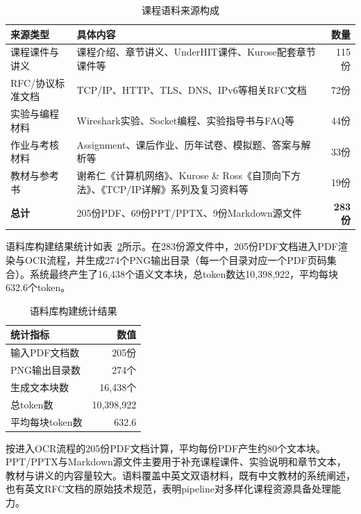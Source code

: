 \begin{table}[H]
    \centering
    \caption{课程语料来源构成}
    \label{tab:5-3}
    \begin{tabular}{lp{8cm}r}
    \toprule
    \textbf{来源类型} & \textbf{具体内容} & \textbf{数量} \\
    \midrule
    课程课件与讲义 & 课程介绍、章节讲义、UnderHIT课件、Kurose配套章节课件等 & 115份 \\
    RFC/协议标准文档 & TCP/IP、HTTP、TLS、DNS、IPv6等相关RFC文档 & 72份 \\
    实验与编程材料 & Wireshark实验、Socket编程、实验指导书与FAQ等 & 44份 \\
    作业与考核材料 & Assignment、课后作业、历年试卷、模拟题、答案与解析等 & 33份 \\
    教材与参考书 & 谢希仁《计算机网络》、Kurose \& Ross《自顶向下方法》、《TCP/IP详解》系列及复习资料等 & 19份 \\
    \midrule
    \textbf{总计} & 205份PDF、69份PPT/PPTX、9份Markdown源文件 & \textbf{283份} \\
    \bottomrule
    \end{tabular}
\end{table}

语料库构建结果统计如表~\ref{tab:5-4}所示。在283份源文件中，205份PDF文档进入PDF渲染与OCR流程，并生成274个PNG输出目录（每一个目录对应一个PDF页码集合）。系统最终产生了16,438个语义文本块，总token数达10,398,922，平均每块632.6个token。

\begin{table}[ht]
    \centering
    \caption{语料库构建统计结果}
    \label{tab:5-4}
    \begin{tabular}{lr}
    \toprule
    \textbf{统计指标} & \textbf{数值} \\
    \midrule
    输入PDF文档数 & 205份 \\
    PNG输出目录数 & 274个 \\
    生成文本块数 & 16,438个 \\
    总token数 & 10,398,922 \\
    平均每块token数 & 632.6 \\
    \bottomrule
    \end{tabular}
\end{table}

按进入OCR流程的205份PDF文档计算，平均每份PDF产生约80个文本块。PPT/PPTX与Markdown源文件主要用于补充课程课件、实验说明和章节文本，教材与讲义的内容量较大。语料覆盖中英文双语材料，既有中文教材的系统阐述，也有英文RFC文档的原始技术规范，表明pipeline对多样化课程资源具备处理能力。

